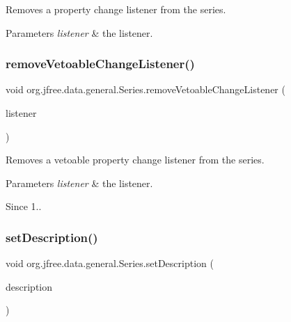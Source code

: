 Removes a property change listener from the series.


\begin{DoxyParams}{Parameters}
{\em listener} & the listener. \\
\hline
\end{DoxyParams}
\mbox{\label{classorg_1_1jfree_1_1data_1_1general_1_1_series_aede4a6b692401c0e85e74cdd005236db}} 
\subsubsection{\texorpdfstring{remove\+Vetoable\+Change\+Listener()}{removeVetoableChangeListener()}}
{\footnotesize\ttfamily void org.\+jfree.\+data.\+general.\+Series.\+remove\+Vetoable\+Change\+Listener (\begin{DoxyParamCaption}\item[{Vetoable\+Change\+Listener}]{listener }\end{DoxyParamCaption})}

Removes a vetoable property change listener from the series.


\begin{DoxyParams}{Parameters}
{\em listener} & the listener.\\
\hline
\end{DoxyParams}
\begin{DoxySince}{Since}
1.. 
\end{DoxySince}
\mbox{\label{classorg_1_1jfree_1_1data_1_1general_1_1_series_af5fefb218fda90ab6a957141e7b7e2e3}} 
\subsubsection{\texorpdfstring{set\+Description()}{setDescription()}}
{\footnotesize\ttfamily void org.\+jfree.\+data.\+general.\+Series.\+set\+Description (\begin{DoxyParamCaption}\item[{String}]{description }\end{DoxyParamCaption})}

